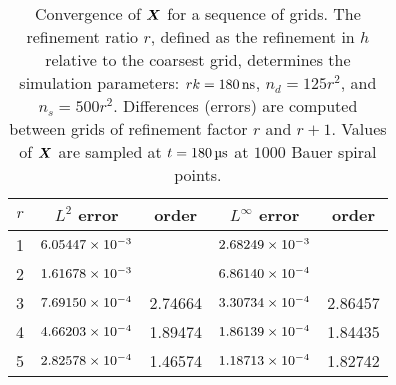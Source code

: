 \begin{table}[tb]
    \centering
    \caption[Convergence of surface positions for relaxing RBC test]{%
Convergence of $\boldsymbol{X}$ for a sequence of grids. The refinement ratio $r$, defined as the refinement in $h$ relative
to the coarsest grid, determines the simulation parameters: $r\timestep = 180\ns$, $n_d = 125r^2$, and
$n_s = 500r^2$. Differences (errors) are computed between grids of refinement factor $r$ and $r+1$. Values of $\boldsymbol{X}$ are sampled
at $t = 180\us$ at $1000$ Bauer spiral points.
    }\label{tab:x-rbc-conv}
    \begingroup
    \setlength{\tabcolsep}{9pt}
    \renewcommand{\arraystretch}{1.5}
    \begin{tabular}{c|cc|cc}
                                                                                     \toprule
        $r$ & $L^2$ error            & order   & $L^\infty$ error       & order   \\ \midrule
        1   & ${6.05447}\times 10^{-3}$ &         & ${2.68249}\times 10^{-3}$ &         \\
        2   & ${1.61678}\times 10^{-3}$ &         & ${6.86140}\times 10^{-4}$ &         \\
        3   & ${7.69150}\times 10^{-4}$ & 2.74664 & ${3.30734}\times 10^{-4}$ & 2.86457 \\
        4   & ${4.66203}\times 10^{-4}$ & 1.89474 & ${1.86139}\times 10^{-4}$ & 1.84435 \\
        5   & ${2.82578}\times 10^{-4}$ & 1.46574 & ${1.18713}\times 10^{-4}$ & 1.82742 \\ \bottomrule
    \end{tabular}
    \endgroup
\end{table}
